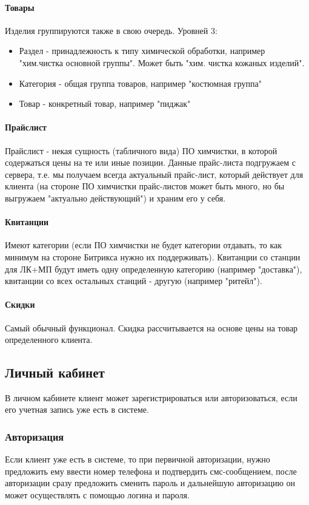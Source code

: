 \documentclass[DIV=calc, paper=a4, fontsize=11pt]{scrartcl} %
\begin{document}
\paragraph{Товары}\label{paragraph:goods}
Изделия группируются также в свою очередь. Уровней 3:
\begin{itemize}
	\item Раздел - принадлежность к типу химической обработки, например "хим.чистка основной группы". Может быть "хим. чистка кожаных изделий".
	\item Категория - общая группа товаров, например "костюмная группа"
	\item Товар - конкретный товар, например "пиджак"
\end{itemize}

\paragraph{Прайслист}
Прайслист - некая сущность (табличного вида) ПО химчистки, в которой содержаться цены на те или иные позиции. Данные прайс-листа подгружаем с сервера, т.е. мы получаем всегда актуальный прайс-лист, который действует для клиента (на стороне ПО химчистки прайс-листов может быть много, но бы выгружаем "актуально действующий") и храним его у себя.

\paragraph{Квитанции}
Имеют категории (если ПО химчистки не будет категории отдавать, то как минимум на стороне Битрикса нужно их поддерживать). Квитанции со станции для ЛК+МП будут иметь одну определенную категорию (например "доставка"), квитанции со всех остальных станций - другую (например "ритейл").

\paragraph{Скидки}
Самый обычный функционал. Скидка рассчитывается на основе цены на товар определенного клиента.


\subsection{Личный кабинет}
В личном кабинете клиент может зарегистрироваться или авторизоваться, если его учетная запись уже есть в системе.

\subsubsection{Авторизация}
Если клиент уже есть в системе, то при первичной авторизации, нужно предложить ему ввести номер телефона и подтвердить смс-сообщением, после авторизации сразу предложить сменить пароль и дальнейшую авторизацию он может осуществлять с помощью логина и пароля.
\end{document}
